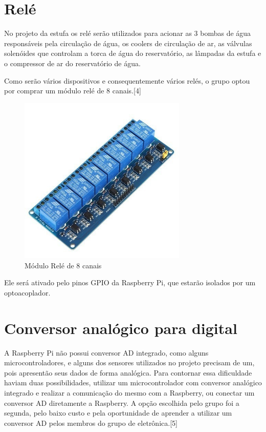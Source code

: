 \section{Relé}

No projeto da estufa os relé serão utilizados para acionar as 3 bombas de água responsáveis pela circulação de água, os coolers de circulação de ar, as válvulas solenóides que controlam a torca de água do reservatório, as lâmpadas da estufa e o compressor de ar do reservatório de água.

Como serão vários dispositivos e consequentemente vários relés, o grupo optou por comprar um módulo relé de 8 canais.[4]

\begin{figure}[H]
	\centering
	\includegraphics[width=8cm]{figuras/modulo_re.jpg}
	\caption{Módulo Relé de 8 canais} \label{modulo_re}
\end{figure}

Ele será ativado pelo pinos GPIO da Raspberry Pi, que estarão isolados por um optoacoplador.

\section{Conversor analógico para digital}

A Raspberry Pi não possui conversor AD integrado, como alguns microcontroladores, e alguns dos sensores utilizados no projeto precisam de um, pois apresentão seus dados de forma analógica. Para contornar essa dificuldade haviam duas possibilidades, utilizar um microcontrolador com conversor analógico integrado e realizar a comunicação do mesmo com a Raspberry, ou conectar um conversor AD diretamente a Raspberry. A opção escolhida pelo grupo foi a segunda, pelo baixo custo e pela oportunidade de aprender a utilizar um conversor AD pelos membros do grupo de eletrônica.[5]
 
